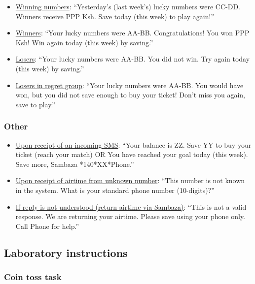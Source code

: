 \documentclass[11pt]{article}
\begin{document}
            \begin{itemize}
                \item \underline{Winning numbers}: ``Yesterday's (last week's) lucky numbers were CC-DD. Winners receive PPP Ksh. Save today (this week) to play again!''
                \item \underline{Winners}: ``Your lucky numbers were AA-BB. Congratulations!  You won PPP Ksh!  Win again today (this week) by saving.''
                \item \underline{Losers}: ``Your lucky numbers were AA-BB. You did not win. Try again today (this week) by saving.''
                \item \underline{Losers in regret group}: ``Your lucky numbers were AA-BB. You would have won, but you did not save enough to buy your ticket!  Don't miss you again, save to play.''
            \end{itemize}

        \subsubsection{Other}

            \begin{itemize}
                \item \underline{Upon receipt of an incoming SMS}: ``Your balance is ZZ. Save YY to buy your ticket (reach your match) OR You have reached your goal today (this week). Save more, Sambaza *140*XX*Phone.''
                \item \underline{Upon receipt of airtime from unknown number}: ``This number is not known in the system. What is your standard phone number (10-digits)?''
                \item \underline{If reply is not understood (return airtime via Sambaza)}: ``This is not a valid response. We are returning your airtime. Please save using your phone only. Call Phone for help.''
            \end{itemize}

    \subsection{Laboratory instructions}

        \subsubsection{Coin toss task}
\end{document}
